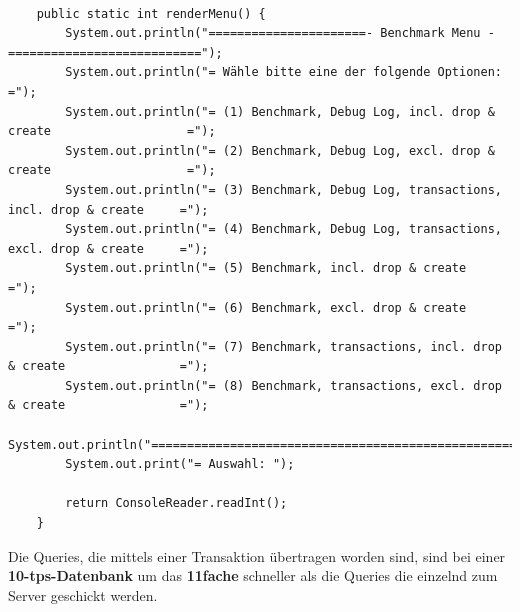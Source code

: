 \begin{lstlisting}

	public static int renderMenu() {
		System.out.println("======================- Benchmark Menu -===========================");
		System.out.println("= Wähle bitte eine der folgende Optionen:                         =");
		System.out.println("= (1) Benchmark, Debug Log, incl. drop & create                   =");
		System.out.println("= (2) Benchmark, Debug Log, excl. drop & create                   =");
		System.out.println("= (3) Benchmark, Debug Log, transactions, incl. drop & create     =");
		System.out.println("= (4) Benchmark, Debug Log, transactions, excl. drop & create     =");
		System.out.println("= (5) Benchmark, incl. drop & create                              =");
		System.out.println("= (6) Benchmark, excl. drop & create                              =");
		System.out.println("= (7) Benchmark, transactions, incl. drop & create                =");
		System.out.println("= (8) Benchmark, transactions, excl. drop & create                =");
		System.out.println("===================================================================");
		System.out.print("= Auswahl: ");
		
		return ConsoleReader.readInt();
	}
\end{lstlisting}

 
Die Queries, die mittels einer Transaktion übertragen worden sind, sind bei
einer \textbf{10-tps-Datenbank} um \ca das \textbf{11fache} schneller als die
Queries die einzelnd zum Server geschickt werden.

\begin{figure}[!htbp] 
\end{figure} 


